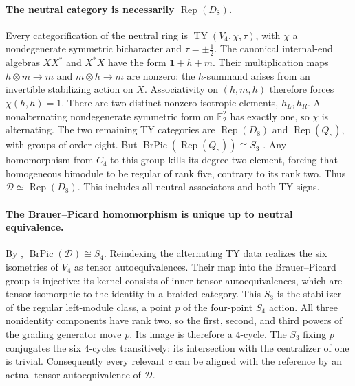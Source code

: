 \documentclass[11pt,a4paper]{article}
\begin{document}
\paragraph{The neutral category is necessarily $\operatorname{Rep}(D_8)$.}
Every categorification of the neutral ring is
$\operatorname{TY}(V_4,\chi,\tau)$, with $\chi$ a nondegenerate symmetric
bicharacter and $\tau=\pm\tfrac12$.
The canonical internal-end algebras $XX^*$ and $X^*X$ have the form
$\mathbf1+h+m$. Their multiplication maps $h\otimes m\to m$ and
$m\otimes h\to m$ are nonzero: the $h$-summand arises from an invertible
stabilizing action on $X$. Associativity on $(h,m,h)$ therefore forces
$\chi(h,h)=1$. There are two distinct nonzero isotropic elements,
$h_L,h_R$. A nonalternating nondegenerate symmetric form on
$\mathbb F_2^2$ has exactly one, so $\chi$ is alternating.
The two remaining TY categories are $\operatorname{Rep}(D_8)$ and
$\operatorname{Rep}(Q_8)$, with groups of order eight.
But $\operatorname{BrPic}(\operatorname{Rep}(Q_8))\cong S_3$
\cite[Remark~9.4]{NikshychRiepel}. Any homomorphism from $C_4$ to this
group kills its degree-two element, forcing that homogeneous bimodule
to be regular of rank five, contrary to its rank two.
Thus $\mathcal D\simeq\operatorname{Rep}(D_8)$. This includes all neutral
associators and both TY signs.

\paragraph{The Brauer--Picard homomorphism is unique up to neutral equivalence.}
By \cite[Section~9.1]{NikshychRiepel},
$\operatorname{BrPic}(\mathcal D)\cong S_4$.
Reindexing the alternating TY data realizes the six isometries of $V_4$
as tensor autoequivalences. Their map into the Brauer--Picard group is
injective: its kernel consists of inner tensor autoequivalences, which
are tensor isomorphic to the identity in a braided category.
This $S_3$ is the stabilizer of the regular left-module class, a point
$p$ of the four-point $S_4$ action.
All three nonidentity components have rank two, so the first, second,
and third powers of the grading generator move $p$. Its image is
therefore a $4$-cycle. The $S_3$ fixing $p$ conjugates the six $4$-cycles
transitively: its intersection with the centralizer of one is trivial.
Consequently every relevant $c$ can be aligned with the reference by
an actual tensor autoequivalence of $\mathcal D$.
\end{document}

